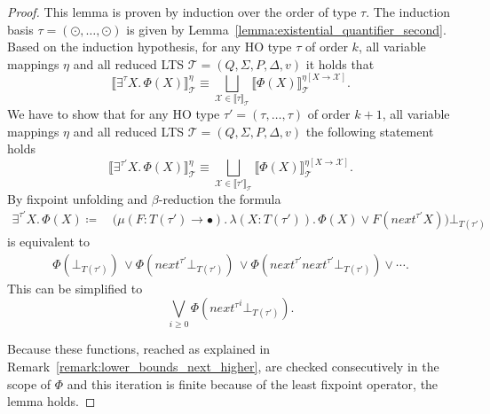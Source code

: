 \begin{proof}
    This lemma is proven by induction over the order of type $\tau$. The induction basis $\tau = (\odot, \dots, \odot)$ is given by Lemma~\ref{lemma:existential_quantifier_second}. Based on the induction hypothesis, for any HO type $\tau$ of order $k$, all variable mappings $\eta$ and all reduced LTS $\mathcal{T} = (Q, \Sigma, P, \Delta, v)$ it holds that
    \[\llbracket \exists^\tau X.\,\Phi(X)\rrbracket^\eta_\mathcal{T} \equiv \underset{\mathcal{X} \in \llbracket \tau
    \rrbracket_\mathcal{T}}{\bigsqcup} \llbracket \Phi(X) \rrbracket^{\eta[X\rightarrow \mathcal{X}]}_\mathcal{T}.\]
    We have to show that for any HO type $\tau'=(\tau, \dots, \tau)$ of order $k+1$, all variable mappings $\eta$ and all reduced LTS $\mathcal{T} = (Q, \Sigma, P, \Delta, v)$ the following statement holds
    \[\llbracket \exists^{\tau'} X.\,\Phi(X)\rrbracket^\eta_\mathcal{T} \equiv \underset{\mathcal{X} \in \llbracket \tau'
    \rrbracket_\mathcal{T}}{\bigsqcup} \llbracket \Phi(X) \rrbracket^{\eta[X\rightarrow \mathcal{X}]}_\mathcal{T}.\]    
     By fixpoint unfolding and $\beta$-reduction the formula
    \begin{align*}
        \exists^{\tau'}X.\, \Phi(X) \coloneqq &\,\big(\mu (F \colon T(\tau') \rightarrow \bullet).\, \lambda (X \colon T(\tau')).\,
        \Phi(X)
        \vee F(next^{\tau'} X)\big)\bot_{T(\tau')}
    \end{align*}    
    is equivalent to
    \begin{align*}
        \Phi(\bot_{T(\tau')})\, \vee 
        \Phi(next^{\tau'} \bot_{T(\tau')})\, \vee 
        \Phi(next^{\tau'} next^{\tau'} \bot_{T(\tau')}) \vee \dotsb.
    \end{align*}    
    This can be simplified to
    \[\underset{i\geq0}{\bigvee} \Phi({next^{\tau}}^i \bot_{T(\tau')}).\]
    
	Because these functions, reached as explained in Remark~\ref{remark:lower_bounds_next_higher}, are checked consecutively in the scope of $\Phi$ and this iteration is finite 
	because of the least fixpoint operator, the lemma holds.
\end{proof}